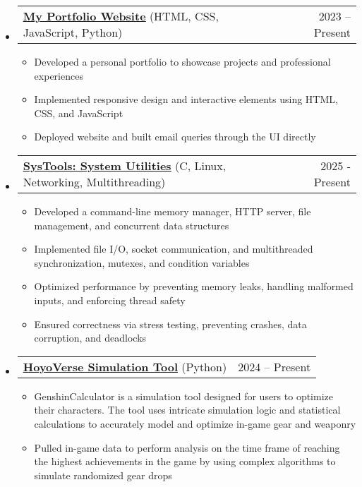 \documentclass[letterpaper,11pt]{article}
\makeatletter
\newcommand{\resumeItem}[1]{
  \item\small{
    {#1 \vspace{-2pt}}
  }
}
\newcommand{\resumeProjectHeading}[2]{
    \item
    \begin{tabular*}{0.97\textwidth}[t]{l@{\extracolsep{\fill}}r}
      \small#1 & #2 \\
    \end{tabular*}\vspace{-7pt}
}
\newcommand{\resumeSubHeadingListStart}{\begin{itemize}[leftmargin=0.15in, label={}]}
\newcommand{\resumeSubHeadingListEnd}{\end{itemize}}
\newcommand{\resumeItemListStart}{\begin{itemize}}
\newcommand{\resumeItemListEnd}{\end{itemize}\vspace{-5pt}}
\makeatother
\begin{document}
  \resumeSubHeadingListStart
    \resumeProjectHeading
      {\href{https://github.com/ezouu/ezouu.github.io}{\underline{\textbf{My Portfolio Website}}} \textnormal{(HTML, CSS, JavaScript, Python)}}{2023 -- Present}
      \resumeItemListStart
        \resumeItem{Developed a personal portfolio to showcase projects and professional experiences}
        \resumeItem{Implemented responsive design and interactive elements using HTML, CSS, and JavaScript}
        \resumeItem{Deployed website and built email queries through the UI directly}
      \resumeItemListEnd
  \resumeSubHeadingListEnd

  \resumeSubHeadingListStart
    \resumeProjectHeading
{\href{https://github.com/ezouu/sys-tools}{\underline{\textbf{SysTools: System Utilities}}} \textnormal{(C, Linux, Networking, Multithreading)}}{2025 - Present}
      \resumeItemListStart
        \resumeItem{Developed a command-line memory manager, HTTP server, file management, and concurrent data structures}
        \resumeItem{Implemented file I/O, socket communication, and multithreaded synchronization, mutexes, and condition variables}
        \resumeItem{Optimized performance by preventing memory leaks, handling malformed inputs, and enforcing thread safety}
        \resumeItem{Ensured correctness via stress testing, preventing crashes, data corruption, and deadlocks}
      \resumeItemListEnd
  \resumeSubHeadingListEnd

  \resumeSubHeadingListStart
    \resumeProjectHeading
      {\href{https://github.com/ezouu/genshincalculator}{\underline{\textbf{HoyoVerse Simulation Tool}}} \textnormal{(Python)}}{2024 -- Present}
      \resumeItemListStart
        \resumeItem{GenshinCalculator is a simulation tool designed for users to optimize their characters. The tool uses intricate simulation logic and statistical calculations to accurately model and optimize in-game gear and weaponry}
        \resumeItem{Pulled in-game data to perform analysis on the time frame of reaching the highest achievements in the game by using complex algorithms to simulate randomized gear drops}
      \resumeItemListEnd
  \resumeSubHeadingListEnd

\end{document}
